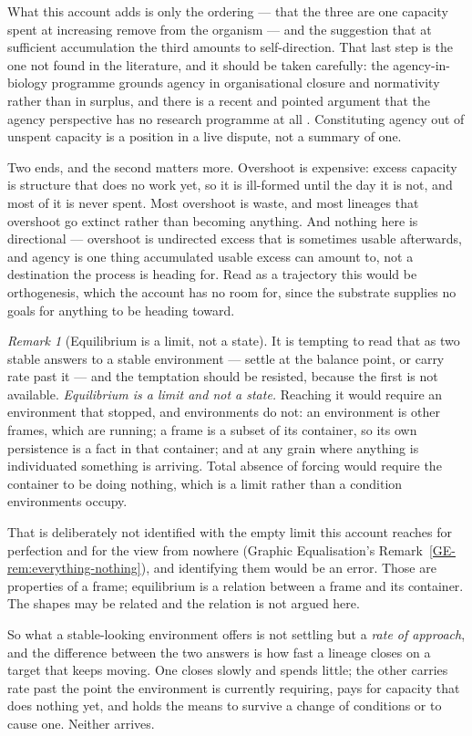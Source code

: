 \documentclass[11pt,a4paper]{article}
\theoremstyle{remark}
\newtheorem{remark}[definition]{Remark}
\begin{document}
What this account adds is only the ordering --- that the three are one capacity spent at increasing
remove from the organism --- and the suggestion that at sufficient accumulation the third amounts to
self-direction. That last step is the one not found in the literature, and it should be taken
carefully: the agency-in-biology programme grounds agency in organisational closure and normativity
rather than in surplus, and there is a recent and pointed argument that the agency perspective has no
research programme at all \citep{difriscogawne2025}. Constituting agency out of unspent capacity is a
position in a live dispute, not a summary of one.

Two ends, and the second matters more. Overshoot is expensive: excess capacity is structure that does
no work yet, so it is ill-formed until the day it is not, and most of it is never spent. Most
overshoot is waste, and most lineages that overshoot go extinct rather than becoming anything. And
nothing here is directional --- overshoot is undirected excess that is sometimes usable afterwards,
and agency is one thing accumulated usable excess can amount to, not a destination the process is
heading for. Read as a trajectory this would be orthogenesis, which the account has no room for,
since the substrate supplies no goals for anything to be heading toward.

\begin{remark}[Equilibrium is a limit, not a state]\label{rem:equilibrium-limit}
It is tempting to read that as two stable answers to a stable environment --- settle at the balance
point, or carry rate past it --- and the temptation should be resisted, because the first is not
available. \emph{Equilibrium is a limit and not a state.} Reaching it would require an environment
that stopped, and environments do not: an environment is other frames, which are running; a frame is
a subset of its container, so its own persistence is a fact in that container; and at any grain where
anything is individuated something is arriving. Total absence of forcing would require the container
to be doing nothing, which is a limit rather than a condition environments occupy.

That is deliberately not identified with the empty limit this account reaches for perfection and for
the view from nowhere (Graphic Equalisation's Remark~\ref{GE-rem:everything-nothing}), and
identifying them would be an error. Those are properties of a frame; equilibrium is a relation between a frame and its container. The shapes may
be related and the relation is not argued here.

So what a stable-looking environment offers is not settling but a \emph{rate of approach}, and the
difference between the two answers is how fast a lineage closes on a target that keeps moving. One
closes slowly and spends little; the other carries rate past the point the environment is currently
requiring, pays for capacity that does nothing yet, and holds the means to survive a change of
conditions or to cause one. Neither arrives.
\end{remark}
\end{document}
